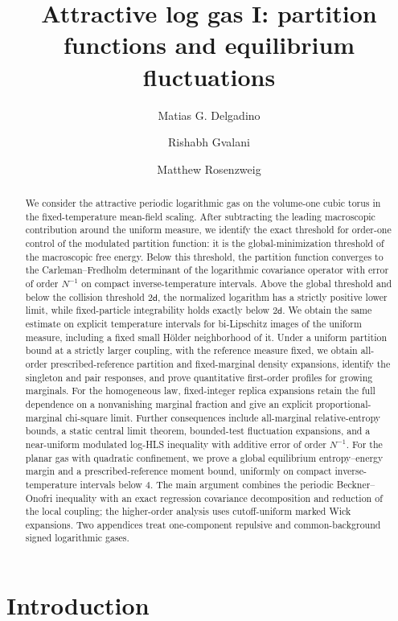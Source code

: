 \documentclass[11pt,reqno]{amsart}
\title[Attractive log gas I]
{Attractive log gas I: partition functions and equilibrium fluctuations}
\author[M. G. Delgadino]{Matias G. Delgadino}
\author[R. Gvalani]{Rishabh Gvalani}
\author[M. Rosenzweig]{Matthew Rosenzweig}
\numberwithin{equation}{section}
\theoremstyle{plain}
\theoremstyle{definition}
\renewcommand{\d}{\mathsf d}
\begin{document}
\begin{abstract}

We consider the attractive periodic logarithmic gas on the volume-one cubic torus in the fixed-temperature mean-field scaling. After subtracting the leading macroscopic contribution around the uniform measure, we identify the exact threshold for order-one control of the modulated partition function: it is the global-minimization threshold of the macroscopic free energy. Below this threshold, the partition function converges to the Carleman--Fredholm determinant of the logarithmic covariance operator with error of order $N^{-1}$ on compact inverse-temperature intervals. Above the global threshold and below the collision threshold $2\d$, the normalized logarithm has a strictly positive lower limit, while fixed-particle integrability holds exactly below $2\d$. We obtain the same estimate on explicit temperature intervals for bi-Lipschitz images of the uniform measure, including a fixed small H\"older neighborhood of it. Under a uniform partition bound at a strictly larger coupling, with the reference measure fixed, we obtain all-order prescribed-reference partition and fixed-marginal density expansions, identify the singleton and pair responses, and prove quantitative first-order profiles for growing marginals. For the homogeneous law, fixed-integer replica expansions retain the full dependence on a nonvanishing marginal fraction and give an explicit proportional-marginal chi-square limit. Further consequences include all-marginal relative-entropy bounds, a static central limit theorem, bounded-test fluctuation expansions, and a near-uniform modulated log-HLS inequality with additive error of order $N^{-1}$. For the planar gas with quadratic confinement, we prove a global equilibrium entropy--energy margin and a prescribed-reference moment bound, uniformly on compact inverse-temperature intervals below $4$. The main argument combines the periodic Beckner--Onofri inequality with an exact regression covariance decomposition and reduction of the local coupling; the higher-order analysis uses cutoff-uniform marked Wick expansions. Two appendices treat one-component repulsive and common-background signed logarithmic gases.

\end{abstract}
\maketitle

\section{Introduction}
\label{sec:introduction}
\end{document}
